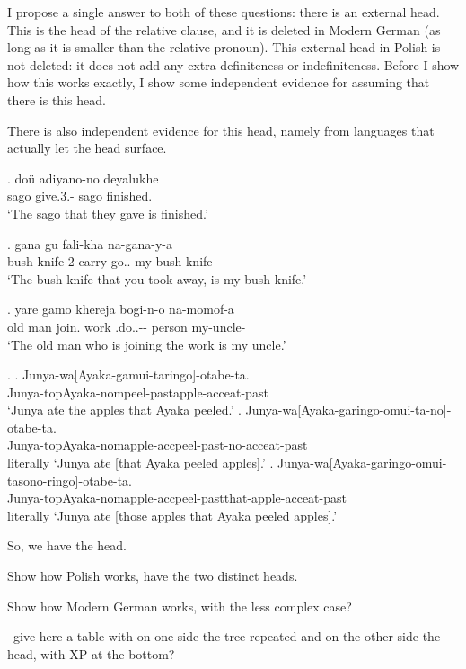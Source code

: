 I propose a single answer to both of these questions: there is an external head. This is the head of the relative clause, and it is deleted in Modern German (as long as it is smaller than the relative pronoun). This external head in Polish is not deleted: it does not add any extra definiteness or indefiniteness. Before I show how this works exactly, I show some independent evidence for assuming that there is this head.

There is also independent evidence for this head, namely from languages that actually let the head surface.

\exg. doü adiyano-no  deyalukhe\\
 sago give.3.- sago finished.\\
 `The sago that they gave is finished.' 

\exg. gana gu fali-kha  na-gana-y-a\\
 {bush knife} 2 carry-go.. my-{bush knife}-\\
 `The bush knife that you took away, is my bush knife.'

\exg. yare gamo khereja bogi-n-o  na-momof-a\\
 {old man} join. work .do..-- person my-uncle-\\
 `The old man who is joining the work is my uncle.'

\ex.
\ag. Junya-wa[Ayaka-gamui-taringo]-otabe-ta.\\
 Junya-topAyaka-nompeel-pastapple-acceat-past\\
 ‘Junya ate the apples that Ayaka peeled.’
\bg. Junya-wa[Ayaka-garingo-omui-ta-no]-otabe-ta.\\
 Junya-topAyaka-nomapple-accpeel-past-no-acceat-past\\
 literally ‘Junya ate [that Ayaka peeled apples].’
\bg. Junya-wa[Ayaka-garingo-omui-tasono-ringo]-otabe-ta.\\
 Junya-topAyaka-nomapple-accpeel-pastthat-apple-acceat-past\\
 literally ‘Junya ate [those apples that Ayaka peeled apples].’

So, we have the head.

Show how Polish works, have the two distinct heads.

Show how Modern German works, with the less complex case?


--give here a table with on one side the tree repeated and on the other side the head, with XP at the bottom?-- %

